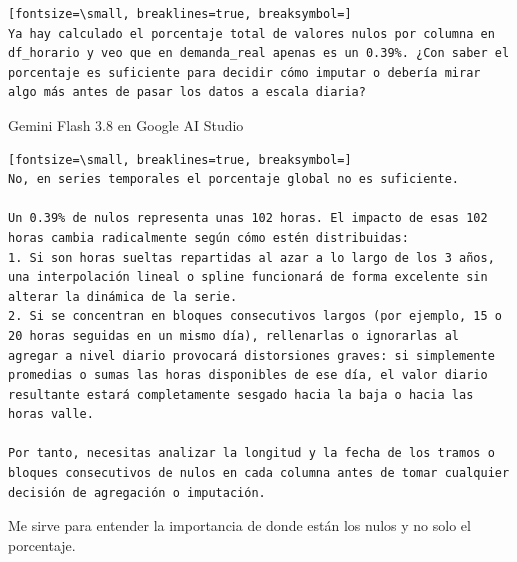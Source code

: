 \documentclass[12pt,a4paper,oneside]{book}
\begin{document}
\begin{iaprompt}
\begin{Verbatim}[fontsize=\small, breaklines=true, breaksymbol=]
Ya hay calculado el porcentaje total de valores nulos por columna en df_horario y veo que en demanda_real apenas es un 0.39%. ¿Con saber el porcentaje es suficiente para decidir cómo imputar o debería mirar algo más antes de pasar los datos a escala diaria?
\end{Verbatim}
\end{iaprompt}
\begin{iaresp}{Gemini Flash 3.8 en Google AI Studio}
\begin{Verbatim}[fontsize=\small, breaklines=true, breaksymbol=]
No, en series temporales el porcentaje global no es suficiente.

Un 0.39% de nulos representa unas 102 horas. El impacto de esas 102 horas cambia radicalmente según cómo estén distribuidas:
1. Si son horas sueltas repartidas al azar a lo largo de los 3 años, una interpolación lineal o spline funcionará de forma excelente sin alterar la dinámica de la serie.
2. Si se concentran en bloques consecutivos largos (por ejemplo, 15 o 20 horas seguidas en un mismo día), rellenarlas o ignorarlas al agregar a nivel diario provocará distorsiones graves: si simplemente promedias o sumas las horas disponibles de ese día, el valor diario resultante estará completamente sesgado hacia la baja o hacia las horas valle.

Por tanto, necesitas analizar la longitud y la fecha de los tramos o bloques consecutivos de nulos en cada columna antes de tomar cualquier decisión de agregación o imputación.
\end{Verbatim}
\end{iaresp}
\begin{iaanalisis}
Me sirve para entender la importancia de donde están los nulos y no solo el porcentaje.
\end{iaanalisis}
\end{document}
